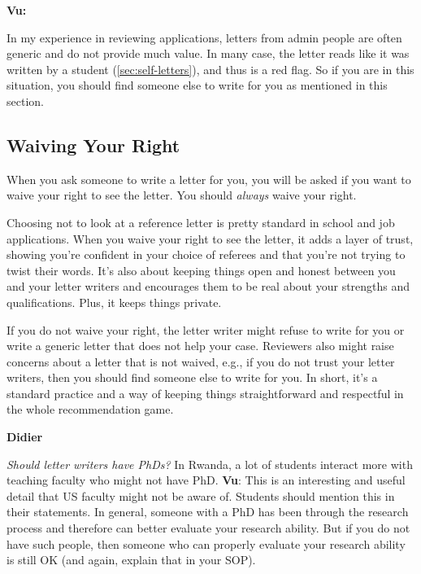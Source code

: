 \documentclass[oneside,11pt,dvipsnames]{book}
\newenvironment{commentbox}[1][]{
  \small
  \begin{mybox}
    {\small \textbf{#1}}
  }{
  \end{mybox}
}
\begin{document}
\begin{commentbox}[Vu:]
  In my experience in reviewing applications, letters from admin people are often generic and do not provide much value. 
  In many case, the letter reads like it was written by a student (\autoref{sec:self-letters}), and thus is a red flag.  So if you are in this situation, you should find someone else to write for you as mentioned in this section.
\end{commentbox}



\subsection{Waiving Your Right}\label{sec:waive-right}

When you ask someone to write a letter for you, you will be asked if you want to waive your right to see the letter.  You should \emph{always} waive your right.

Choosing not to look at a reference letter is pretty standard in school and job applications. When you waive your right to see the letter, it adds a layer of trust, showing you're confident in your choice of referees and that you're not trying to twist their words. It's also about keeping things open and honest between you and your letter writers and encourages them to be real about your strengths and qualifications. Plus, it keeps things private.

If you do not waive your right,  the letter writer might refuse to write for you or write a generic letter that does not help your case.  Reviewers also might raise concerns about a letter that is not waived, e.g., if you do not trust your letter writers, then you should find someone else to write for you. In short, it's a standard practice and a way of keeping things straightforward and respectful in the whole recommendation game.

\begin{commentbox}[Didier]
  \emph{Should letter writers have PhDs?}  In Rwanda, a lot of students interact more with teaching faculty who might not have PhD.
  \tcblower
  \textbf{Vu}: This is an interesting and useful detail that US faculty might not be aware of. Students should mention this in their statements. In general, someone with a PhD has been through the research process and therefore can better evaluate your research ability.  But if you do not have such people, then someone who can properly evaluate your research ability is still OK (and again, explain that in your SOP).
\end{commentbox}
\end{document}
